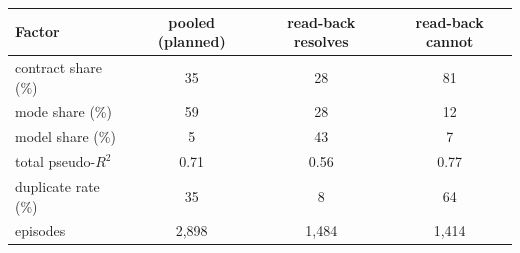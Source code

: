 \begin{tabular}{lccc}
\toprule
Factor & pooled (planned) & read-back resolves & read-back cannot \\
\midrule
contract share (\%) & 35 & 28 & 81 \\
mode share (\%) & 59 & 28 & 12 \\
model share (\%) & 5 & 43 & 7 \\
\midrule
total pseudo-$R^2$ & 0.71 & 0.56 & 0.77 \\
duplicate rate (\%) & 35 & 8 & 64 \\
episodes & 2,898 & 1,484 & 1,414 \\
\bottomrule
\end{tabular}